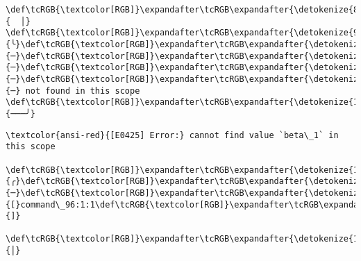 \documentclass[11pt]{article}
\begin{document}
\begin{Verbatim}[commandchars=\\\{\}, frame=single, framerule=2mm, rulecolor=\color{outerrorbackground}]
 \def\tcRGB{\textcolor[RGB]}\expandafter\tcRGB\expandafter{\detokenize{88,88,88}}{  │}                    \def\tcRGB{\textcolor[RGB]}\expandafter\tcRGB\expandafter{\detokenize{95,0,135}}{╰}\def\tcRGB{\textcolor[RGB]}\expandafter\tcRGB\expandafter{\detokenize{95,0,135}}{─}\def\tcRGB{\textcolor[RGB]}\expandafter\tcRGB\expandafter{\detokenize{95,0,135}}{─}\def\tcRGB{\textcolor[RGB]}\expandafter\tcRGB\expandafter{\detokenize{95,0,135}}{─}\def\tcRGB{\textcolor[RGB]}\expandafter\tcRGB\expandafter{\detokenize{95,0,135}}{─} not found in this scope
\def\tcRGB{\textcolor[RGB]}\expandafter\tcRGB\expandafter{\detokenize{148,148,148}}{───╯}
    \end{Verbatim}

    \begin{Verbatim}[commandchars=\\\{\}, frame=single, framerule=2mm, rulecolor=\color{outerrorbackground}]
\textcolor{ansi-red}{[E0425] Error:} cannot find value `beta\_1` in this scope
   \def\tcRGB{\textcolor[RGB]}\expandafter\tcRGB\expandafter{\detokenize{148,148,148}}{╭}\def\tcRGB{\textcolor[RGB]}\expandafter\tcRGB\expandafter{\detokenize{148,148,148}}{─}\def\tcRGB{\textcolor[RGB]}\expandafter\tcRGB\expandafter{\detokenize{148,148,148}}{[}command\_96:1:1\def\tcRGB{\textcolor[RGB]}\expandafter\tcRGB\expandafter{\detokenize{148,148,148}}{]}
   \def\tcRGB{\textcolor[RGB]}\expandafter\tcRGB\expandafter{\detokenize{148,148,148}}{│}

\end{Verbatim}
\end{document}
